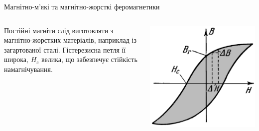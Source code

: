 \documentclass[onlytextwidth]{beamer}
\begin{document}
\begin{frame}{Магнітно-м'які та магнітно-жорсткі феромагнетики}{}
\begin{columns}
\begin{column}{0.25\linewidth}
		\end{column}
	\end{columns}
	\begin{columns}
		\begin{column}{0.75\linewidth}
			\begin{block}{}\justifying\small
				Постійні магніти слід виготовляти з \alert{магнітно-жорстких} матеріалів, наприклад із загартованої сталі. Гістерезисна петля її
				широка, $H_c$ велика, що забезпечує стійкість намагнічування.
			\end{block}
		\end{column}
		\begin{column}{0.25\linewidth}\centering
			\includegraphics[width=0.8\linewidth]{Hard}
		\end{column}
	\end{columns}

\end{frame}
\end{document}
